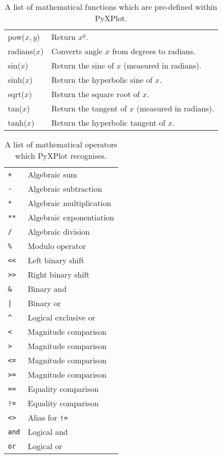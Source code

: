 \begin{table}
\begin{longtable}{|lp{8cm}|}
pow($x,y$)&
Return $x^y$.\\
radians($x$)&
Converts angle $x$ from degrees to radians.\\
sin($x$)&
Return the sine of $x$ (measured in radians).\\
sinh($x$)&
Return the hyperbolic sine of $x$.\\
sqrt($x$)&
Return the square root of $x$.\\
tan($x$)&
Return the tangent of $x$ (measured in radians).\\
tanh($x$)&
Return the hyperbolic tangent of $x$.\\
\hline
\end{longtable}
\caption{A list of mathematical functions which are pre-defined within PyXPlot.}
\label{functions_table}
\end{table}

\begin{table}
\begin{longtable}{|lp{8cm}|}
\hline
\texttt{+} & Algebraic sum \\
\texttt{-} & Algebraic subtraction \\
\texttt{*} & Algebraic multiplication \\
\texttt{**} & Algebraic exponentiation \\
\texttt{/} & Algebraic division \\
\texttt{\%} & Modulo operator \\
\texttt{<<} & Left binary shift \\
\texttt{>>} & Right binary shift \\
\texttt{\&} & Binary and \\
\texttt{|} & Binary or \\
\texttt{\^{}} & Logical exclusive or \\
\texttt{<} & Magnitude comparison \\
\texttt{>} & Magnitude comparison \\
\texttt{<=} & Magnitude comparison \\
\texttt{>=} & Magnitude comparison \\
\texttt{==} & Equality comparison \\
\texttt{!=} & Equality comparison \\
\texttt{<>} & Alias for \texttt{!=} \\
\texttt{and} & Logical and \\
\texttt{or} & Logical or \\
\hline
\end{longtable}
\caption{A list of mathematical operators which PyXPlot recognises.}
\label{operators_table}
\end{table}


